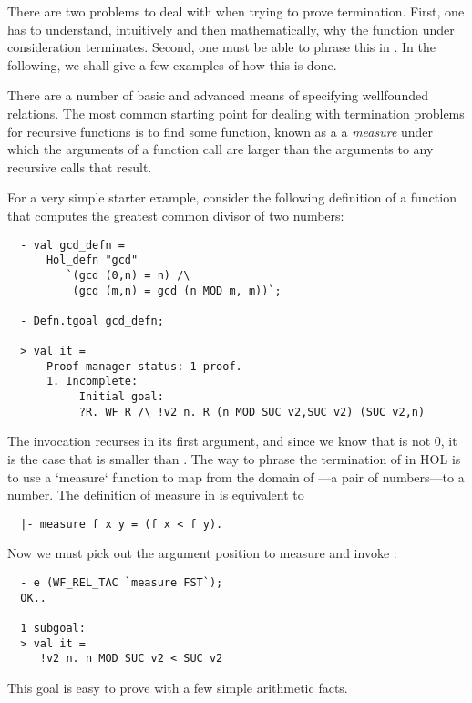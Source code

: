 There are two problems to deal with when trying to prove termination.
First, one has to understand, intuitively and then mathematically,
why the function under consideration terminates. Second, one must
be able to phrase this in \HOL. In the following, we shall give a few
examples of how this is done.

There are a number of basic and advanced means of specifying wellfounded
relations. The most common starting point for dealing with termination
problems for recursive functions is to find some function, known as a a
\emph{measure} under which the arguments of a function call are larger
than the arguments to any recursive calls that result.

For a very simple starter example, consider the following definition
of a function that computes the greatest common divisor of two
numbers:
%
\setcounter{sessioncount}{0}
\begin{session}
\begin{hol}
\begin{verbatim}
  - val gcd_defn =
      Hol_defn "gcd"
         `(gcd (0,n) = n) /\
          (gcd (m,n) = gcd (n MOD m, m))`;

  - Defn.tgoal gcd_defn;

  > val it =
      Proof manager status: 1 proof.
      1. Incomplete:
           Initial goal:
           ?R. WF R /\ !v2 n. R (n MOD SUC v2,SUC v2) (SUC v2,n)
\end{verbatim}
\end{hol}
\end{session}
%
The invocation  recurses in its first argument, and
since we know that  is not 0, it is the case that
 is smaller than \holtxt{m}. The way to phrase the
termination of  in HOL is to use a `measure` function
to map from the domain of \holtxt{gcd}---a pair of numbers---to a number.
The definition of {measure} in \HOL{} is equivalent to
%
\begin{hol}
\begin{verbatim}
  |- measure f x y = (f x < f y).
\end{verbatim}
\end{hol}
%
Now we must pick out the argument position to measure and
invoke :
\begin{session}
\begin{hol}
\begin{verbatim}
  - e (WF_REL_TAC `measure FST`);
  OK..

  1 subgoal:
  > val it =
     !v2 n. n MOD SUC v2 < SUC v2
\end{verbatim}
\end{hol}
\end{session}
%
This goal is easy to prove with a few simple arithmetic facts.

